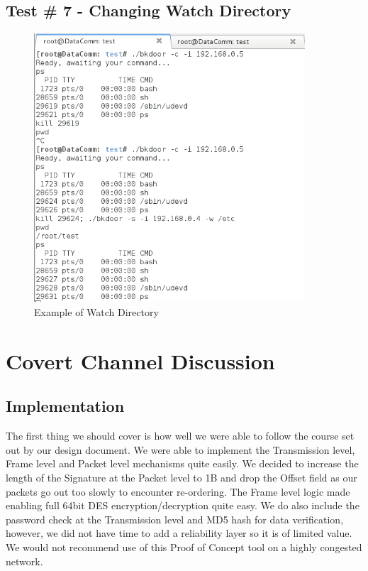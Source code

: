 \documentclass[titlepage]{article}
\begin{document}
\subsection{Test \# 7 - Changing Watch Directory}

\begin{figure}[htb]                                                                       
  \begin{center}
    \includegraphics[width=0.9\textwidth]{Pictures/Watch.png}
  \end{center}
  \caption{Example of Watch Directory}
  \label{fig:watch}
\end{figure}

\clearpage

\section{Covert Channel Discussion}

\subsection{Implementation}

The first thing we should cover is how well we were able to follow the course set out by our design document.  We were able to implement the Transmission level, Frame level and Packet level mechanisms quite easily.  We decided to increase the length of the Signature at the Packet level to 1B and drop the Offset field as our packets go out too slowly to encounter re-ordering.  The Frame level logic made enabling full 64bit DES encryption/decryption quite easy.  We do also include the password check at the Transmission level and MD5 hash for data verification, however, we did not have time to add a reliability layer so it is of limited value. We would not recommend use of this Proof of Concept tool on a highly congested network.
\end{document}
